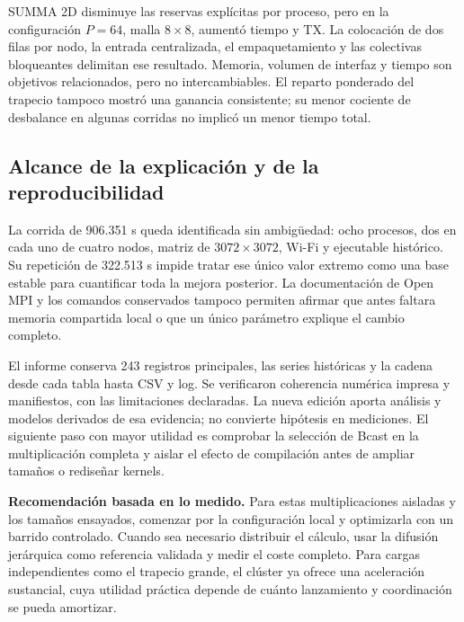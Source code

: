 SUMMA 2D disminuye las reservas explícitas por proceso, pero en la configuración $P=64$, malla $8\times8$, aumentó tiempo y TX. La colocación de dos filas por nodo, la entrada centralizada, el empaquetamiento y las colectivas bloqueantes delimitan ese resultado. Memoria, volumen de interfaz y tiempo son objetivos relacionados, pero no intercambiables. El reparto ponderado del trapecio tampoco mostró una ganancia consistente; su menor cociente de desbalance en algunas corridas no implicó un menor tiempo total.

\subsection{Alcance de la explicación y de la reproducibilidad}

La corrida de 906.351 s queda identificada sin ambigüedad: ocho procesos, dos en cada uno de cuatro nodos, matriz de $3072\times3072$, Wi-Fi y ejecutable histórico. Su repetición de 322.513 s impide tratar ese único valor extremo como una base estable para cuantificar toda la mejora posterior. La documentación de Open MPI y los comandos conservados tampoco permiten afirmar que antes faltara memoria compartida local o que un único parámetro explique el cambio completo.

El informe conserva 243 registros principales, las series históricas y la cadena desde cada tabla hasta CSV y log. Se verificaron coherencia numérica impresa y manifiestos, con las limitaciones declaradas. La nueva edición aporta análisis y modelos derivados de esa evidencia; no convierte hipótesis en mediciones. El siguiente paso con mayor utilidad es comprobar la selección de Bcast en la multiplicación completa y aislar el efecto de compilación antes de ampliar tamaños o rediseñar kernels.

\begin{idea}
\textbf{Recomendación basada en lo medido.} Para estas multiplicaciones aisladas y los tamaños ensayados, comenzar por la configuración local y optimizarla con un barrido controlado. Cuando sea necesario distribuir el cálculo, usar la difusión jerárquica como referencia validada y medir el coste completo. Para cargas independientes como el trapecio grande, el clúster ya ofrece una aceleración sustancial, cuya utilidad práctica depende de cuánto lanzamiento y coordinación se pueda amortizar.
\end{idea}
